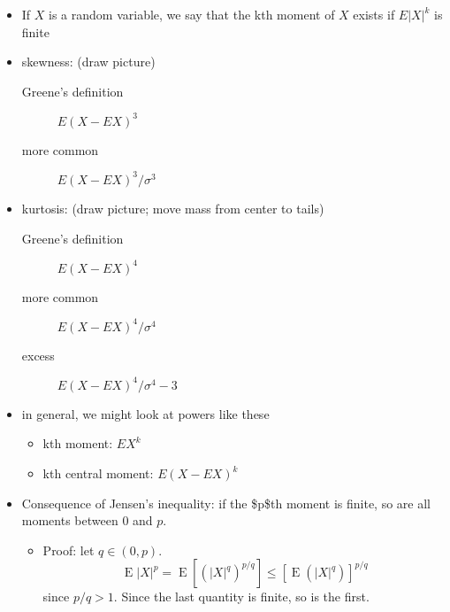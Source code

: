 \documentclass[11pt]{article}
\DeclareMathOperator{\E}{E}
\begin{document}
\begin{itemize}
\item If $X$ is a random variable, we say that the kth moment of $X$
      exists if $E|X|^k$ is finite
\item skewness: (draw picture)
\begin{description}
\item[Greene's definition] $E(X - E X)^3$
\item[more common] $E(X - E X)^3 / \sigma^3$
\end{description}
\item kurtosis: (draw picture; move mass from center to tails)
\begin{description}
\item[Greene's definition] $E(X - E X)^4$
\item[more common] $E(X - E X)^4 / \sigma^4$
\item[excess] $E(X - E X)^4 / \sigma^4 - 3$
\end{description}
\item in general, we might look at powers like these
\begin{itemize}
\item kth moment: $E X^k$
\item kth central moment: $E(X - EX)^k$
\end{itemize}
\item Consequence of Jensen's inequality: if the \$p\$th moment is
      finite, so are all moments between 0 and $p$.
\begin{itemize}
\item Proof: let $q \in (0, p)$.  \[\E |X|^p = \E[( |X|^q)^{p/q}]
        \leq [\E(|X|^q)]^{p/q}\] since $p/q > 1$.  Since the last
        quantity is finite, so is the first.
\end{itemize}
\end{itemize}
\end{document}
